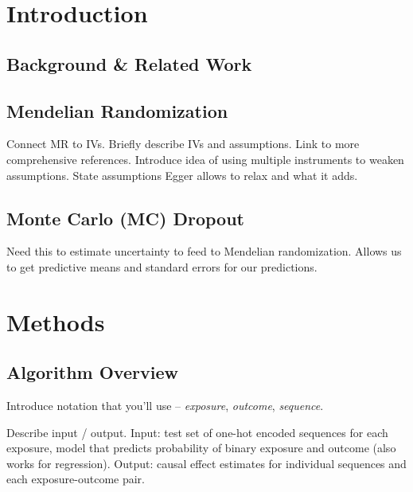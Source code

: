 \documentclass{article}
\begin{document}
\begin{abstract}
\end{abstract}

\section{Introduction}
\label{introduction}

\subsection{Background \& Related Work}
\subsection{Mendelian Randomization}
Connect MR to IVs.
Briefly describe IVs and assumptions. Link to more comprehensive references.
Introduce idea of using multiple instruments to weaken assumptions. State assumptions Egger allows to relax and what it adds.

\subsection{Monte Carlo (MC) Dropout}
Need this to estimate uncertainty to feed to Mendelian randomization.
Allows us to get predictive means and standard errors for our predictions.

\section{Methods}
\subsection{Algorithm Overview}
Introduce notation that you'll use -- \textit{exposure}, \textit{outcome}, \textit{sequence}.

Describe input / output. 
Input: test set of one-hot encoded sequences for each exposure, model that predicts probability of binary exposure and outcome (also works for regression). 
Output: causal effect estimates for individual sequences and each exposure-outcome pair.
\end{document}
